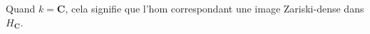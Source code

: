 Quand $k=\mathbf C$, cela signifie que l'hom correspondant
 une image Zariski-dense dans $H_{\mathbf C}$.
